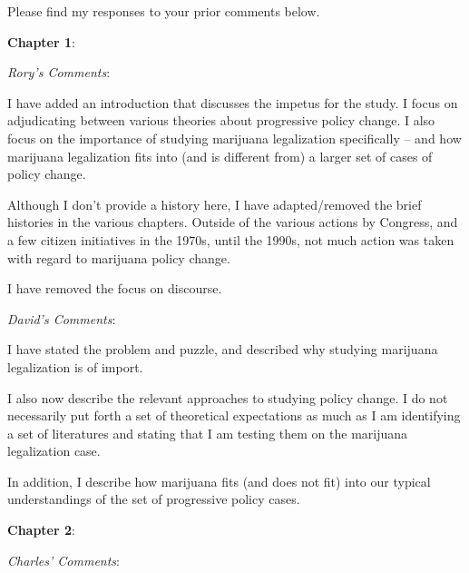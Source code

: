 \documentclass[12pt,stdletter,dateno,sigleft]{newlfm} %
\begin{document}
\begin{newlfm}


Please find my responses to your prior comments below. \newline%


\textbf{Chapter 1}:

\textit{Rory's Comments}:

I have added an introduction that discusses the impetus for the study. I focus on adjudicating between various theories about progressive policy change. I also focus on the importance of studying marijuana legalization specifically -- and how marijuana legalization fits into (and is different from) a larger set of cases of policy change. 

Although I don't provide a history here, I have adapted/removed the brief histories in the various chapters. Outside of the various actions by Congress, and a few citizen initiatives in the 1970s, until the 1990s, not much action was taken with regard to marijuana policy change. 

I have removed the focus on discourse. \newline 

\textit{David's Comments}:

I have stated the problem and puzzle, and described why studying marijuana legalization is of import. 

I also now describe the relevant approaches to studying policy change. I do not necessarily put forth a set of theoretical expectations as much as I am identifying a set of literatures and stating that I am testing them on the marijuana legalization case. 

In addition, I describe how marijuana fits (and does not fit) into our typical understandings of the set of progressive policy cases. 



\textbf{Chapter 2}:

\textit{Charles' Comments}:


\end{newlfm}
\end{document}
